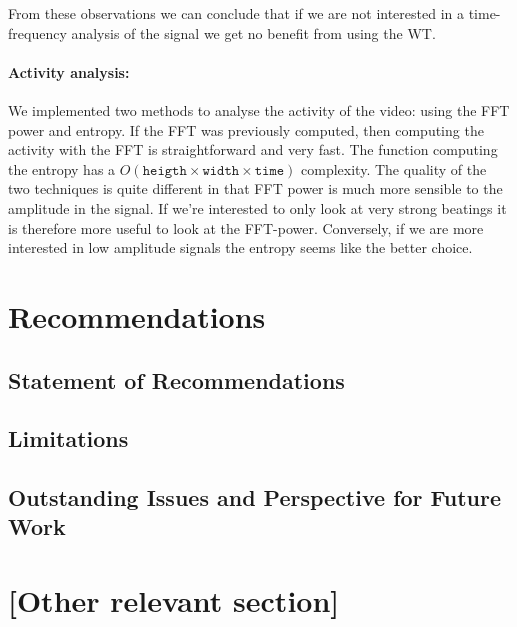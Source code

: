 \documentclass[11pt]{scrartcl}
\begin{document}
From these observations we can conclude that if we are not interested in a time-frequency analysis of the signal we get no benefit from using the WT.

\paragraph{Activity analysis:}

We implemented two methods to analyse the activity of the video: using the FFT power and entropy. 
If the FFT was previously computed, then computing the activity with the FFT is
straightforward and very fast. The function computing the entropy has a $O(\mathtt{heigth} \times \mathtt{width}
\times \mathtt{time})$ complexity. The quality of the two techniques is quite different in that FFT power is much more sensible to the amplitude in the signal. 
If we're interested to only look at very strong beatings it is therefore more useful to look at the FFT-power. Conversely, if we are more interested in low amplitude signals the entropy seems like the better choice. 



\section{Recommendations}


\subsection{Statement of Recommendations}


\subsection{Limitations}


\subsection{Outstanding Issues and Perspective for Future Work}




\section{[Other relevant section]}








\end{document}
